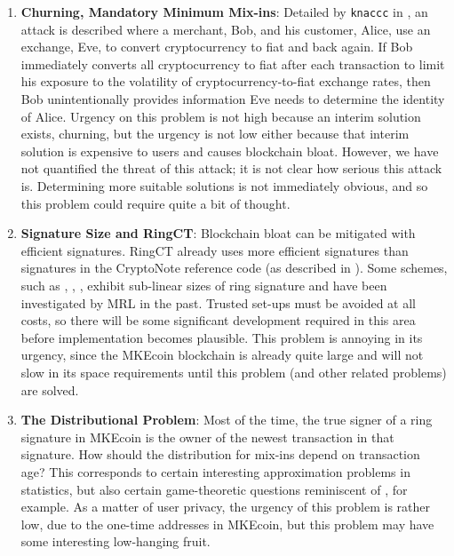 \documentclass[12pt,english]{mrl}
\theoremstyle{definition}
\numberwithin{equation}{section}
\numberwithin{figure}{section}
\numberwithin{equation}{section}
\numberwithin{equation}{section}
\numberwithin{figure}{section}
\begin{document}
\begin{enumerate}[1.]
    
    \item \textbf{Churning, Mandatory Minimum Mix-ins}: Detailed by \texttt{knaccc} in \cite{knaccc2017}, an attack is described where a merchant, Bob, and his customer, Alice, use an exchange, Eve, to convert cryptocurrency to fiat and back again. If Bob immediately converts all cryptocurrency to fiat after each transaction to limit his exposure to the volatility of cryptocurrency-to-fiat exchange rates, then Bob unintentionally provides information Eve needs to determine the identity of Alice. Urgency on this problem is not high because an interim solution exists, churning, but the urgency is not low either because that interim solution is expensive to users and causes blockchain bloat. However, we have not quantified the threat of this attack; it is not clear how serious this attack is. Determining more suitable solutions is not immediately obvious, and so this problem could require quite a bit of thought.
    
    \item \textbf{Signature Size and RingCT}:  Blockchain bloat can be mitigated with efficient signatures. RingCT already uses more efficient signatures than signatures in the CryptoNote reference code (as described in \cite{noether2016ring}). Some schemes, such as \cite{chandran2007ring},  \cite{au2006constant}, \cite{au2006event}, exhibit sub-linear sizes of ring signature and have been investigated by MRL in the past. Trusted set-ups must be avoided at all costs, so there will be some significant development required in this area before implementation becomes plausible. This problem is annoying in its urgency, since the MKEcoin blockchain is already quite large and will not slow in its space requirements until this problem (and other related problems) are solved.
    
    
    \item \textbf{The Distributional Problem}: Most of the time, the true signer of a ring signature in MKEcoin is the owner of the newest transaction in that signature. How should the distribution for mix-ins depend on transaction age? This corresponds to certain interesting approximation problems in statistics, but also certain game-theoretic questions reminiscent of \cite{T-1955}, for example. As a matter of user privacy, the urgency of this problem is rather low, due to the one-time addresses in MKEcoin, but this problem may have some interesting low-hanging fruit.
    

    
    

\end{enumerate}
\end{document}
